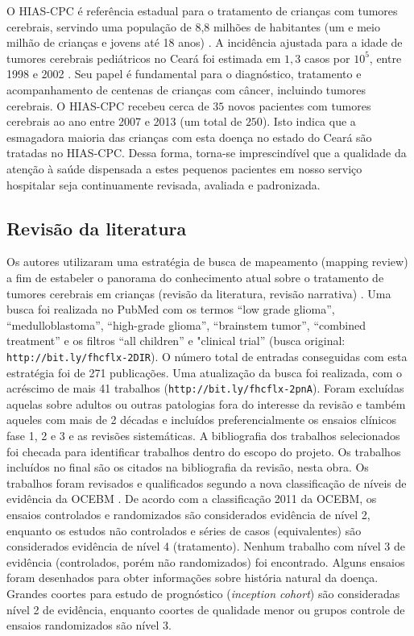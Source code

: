 \documentclass[graybox]{svmult}
\begin{document}
O HIAS-CPC é referência estadual para o tratamento de crianças com tumores cerebrais, servindo uma população de 8,8 milhões de habitantes (um e meio milhão de crianças e jovens até 18 anos) \cite{estat}. A incidência ajustada para a idade de tumores cerebrais pediátricos no Ceará foi estimada em \(1,3\) casos por \(10^5\), entre 1998 e 2002 \cite{inca}. Seu papel é fundamental para o diagnóstico, tratamento e acompanhamento de centenas de crianças com câncer, incluindo tumores cerebrais. O HIAS-CPC recebeu cerca de \(35\) novos pacientes com tumores cerebrais ao ano entre 2007 e 2013 (um total de \(250\)). Isto indica que a esmagadora maioria das crianças com esta doença no estado do Ceará são tratadas no HIAS-CPC. Dessa forma, torna-se imprescindível que a qualidade da atenção à saúde dispensada a estes pequenos pacientes em nosso serviço hospitalar seja continuamente revisada, avaliada e padronizada.

\subsection{Revisão da literatura}
\label{subsec:2}
Os autores utilizaram uma estratégia de busca de mapeamento (mapping review) a fim de estabeler o panorama do conhecimento atual sobre o tratamento de tumores cerebrais em crianças (revisão da literatura, revisão narrativa) \cite{grant,vosgerau}. Uma busca foi realizada no PubMed com os termos “low grade glioma”, “medulloblastoma”, “high-grade glioma”, “brainstem tumor”, “combined treatment” e os filtros “all children” e "clinical trial” (busca original: \texttt{http://bit.ly/fhcflx-2DIR}). O número total de entradas conseguidas com esta estratégia foi de 271 publicações. Uma atualização da busca foi realizada, com o acréscimo de mais 41 trabalhos (\texttt{http://bit.ly/fhcflx-2pnA}). Foram excluídas aquelas sobre adultos ou outras patologias fora do interesse da revisão e também aqueles com mais de 2 décadas e incluídos preferencialmente os ensaios clínicos fase 1, 2 e 3 e as revisões sistemáticas. A bibliografia dos trabalhos selecionados foi checada para identificar trabalhos dentro do escopo do projeto. Os trabalhos incluídos no final são os citados na bibliografia da revisão, nesta obra. Os trabalhos foram revisados e qualificados segundo a nova classificação de níveis de evidência da OCEBM \cite{ocebm}. De acordo com a classificação 2011 da OCEBM, os ensaios controlados e randomizados são considerados evidência de nível 2, enquanto os estudos não controlados e séries de casos (equivalentes) são considerados evidência de nível 4 (tratamento). Nenhum trabalho com nível 3 de evidência (controlados, porém não randomizados) foi encontrado. Alguns ensaios foram desenhados para obter informações sobre história natural da doença. Grandes coortes para estudo de prognóstico (\textit{inception cohort}) são consideradas nível 2 de evidência, enquanto coortes de qualidade menor ou grupos controle de ensaios randomizados são nível 3.
\end{document}
